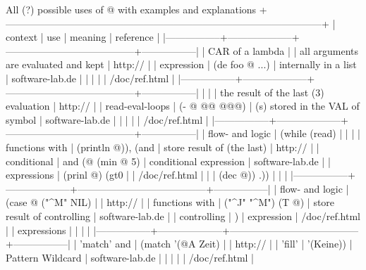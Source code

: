 \begin{wideverbatim}
                    All (?) possible uses of @ with examples and explanations
+------------------------------------------------------------------------------------------------+
|     context     |        use         |                meaning                |    reference    |
|-----------------+--------------------+---------------------------------------+-----------------|
| CAR of a lambda |                    | all arguments are evaluated and kept  | http://         |
| expression      | (de foo @ ...)     | internally in a list                  | software-lab.de |
|                 |                    |                                       | /doc/ref.html   |
|-----------------+--------------------+---------------------------------------+-----------------|
|                 |                    | the result of the last (3) evaluation | http://         |
| read-eval-loops | (- @ @@ @@@)       | (s) stored in the VAL of symbol       | software-lab.de |
|                 |                    |                                       | /doc/ref.html   |
|-----------------+--------------------+---------------------------------------+-----------------|
| flow- and logic | (while (read)      |                                       |                 |
| functions with  | (println @)), (and | store result of (the last)            | http://         |
| conditional     | and (@ (min @ 5)   | conditional expression                | software-lab.de |
| expressions     | (prinl @) (gt0     |                                       | /doc/ref.html   |
|                 | (dec @)) .))       |                                       |                 |
|-----------------+--------------------+---------------------------------------+-----------------|
| flow- and logic | (case @ ("^M" NIL) |                                       | http://         |
| functions with  | ("^J" "^M") (T @)  | store result of controlling           | software-lab.de |
| controlling     | )                  | expression                            | /doc/ref.html   |
| expressions     |                    |                                       |                 |
|-----------------+--------------------+---------------------------------------+-----------------|
| 'match' and     | (match '(@A Zeit)  |                                       | http://         |
| 'fill'          | '(Keine))          | Pattern Wildcard                      | software-lab.de |
|                 |                    |                                       | /doc/ref.html   |

\end{wideverbatim}
